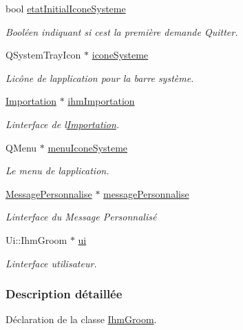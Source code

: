 \begin{DoxyCompactItemize}
bool \hyperlink{class_ihm_groom_a95d2d2b4b3b849c1b21f234844fca056}{etat\+Initial\+Icone\+Systeme}
\begin{DoxyCompactList}\small\item\em Booléen indiquant si c\textquotesingle{}est la première demande Quitter. \end{DoxyCompactList}\item 
Q\+System\+Tray\+Icon $\ast$ \hyperlink{class_ihm_groom_a9ca0929cf284a9a2e3e2bc3489249919}{icone\+Systeme}
\begin{DoxyCompactList}\small\item\em L\textquotesingle{}icône de l\textquotesingle{}application pour la barre système. \end{DoxyCompactList}\item 
\hyperlink{class_importation}{Importation} $\ast$ \hyperlink{class_ihm_groom_ab3f9d16d3e20234a71b1580d70ee4959}{ihm\+Importation}
\begin{DoxyCompactList}\small\item\em L\textquotesingle{}interface de l\textquotesingle{}\hyperlink{class_importation}{Importation}. \end{DoxyCompactList}\item 
Q\+Menu $\ast$ \hyperlink{class_ihm_groom_af2abf22a1a9203af547f32c7edb13710}{menu\+Icone\+Systeme}
\begin{DoxyCompactList}\small\item\em Le menu de l\textquotesingle{}application. \end{DoxyCompactList}\item 
\hyperlink{class_message_personnalise}{Message\+Personnalise} $\ast$ \hyperlink{class_ihm_groom_a529729b93d7b8d17147d3b47fe9a274d}{message\+Personnalise}
\begin{DoxyCompactList}\small\item\em L\textquotesingle{}interface du Message Personnalisé \end{DoxyCompactList}\item 
Ui\+::\+Ihm\+Groom $\ast$ \hyperlink{class_ihm_groom_af652e1ce199213b7867e44cf589c06b8}{ui}
\begin{DoxyCompactList}\small\item\em L\textquotesingle{}interface utilisateur. \end{DoxyCompactList}\end{DoxyCompactItemize}


\subsubsection{Description détaillée}
Déclaration de la classe \hyperlink{class_ihm_groom}{Ihm\+Groom}. 

